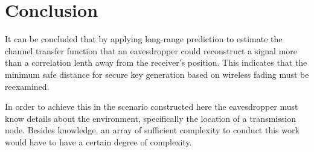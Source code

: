 \documentclass{allertonproc}
\begin{document}
\section{Conclusion}

It can be concluded that by applying long-range prediction to estimate the channel transfer function that an eavesdropper could reconstruct a signal more than a correlation lenth away from the receiver's position.  This indicates that the minimum safe distance for secure key generation based on wireless fading must be reexamined.

In order to achieve this in the scenario constructed here the eavesdropper must know details about the environment, specifically the location of a transmission node. Besides knowledge, an array of sufficient complexity to conduct this work would have to have a certain degree of complexity. 



{}
\end{document}
